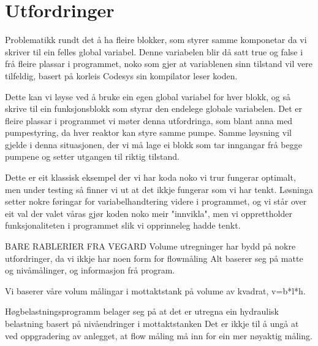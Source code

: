 \section{Utfordringer}
\thispagestyle{fancy}

Problematikk rundt det å ha fleire blokker, som styrer samme komponetar da vi skriver til ein felles global variabel.
Denne variabelen blir då satt true og false i frå fleire plassar i programmet, noko som gjer at variablenen sinn tilstand vil vere tilfeldig, basert på korleis Codesys sin kompilator leser koden.

Dette kan vi løyse ved å bruke ein egen global variabel for hver blokk, og så skrive til ein funksjonsblokk som styrar den endelege globale variabelen.
Det er fleire plassar i programmet vi møter denna utfordringa, som blant anna med pumpestyring, da hver reaktor kan styre samme pumpe.
Samme løysning vil gjelde i denna situasjonen, der vi må lage ei blokk som tar inngangar frå begge pumpene og setter utgangen til riktig tilstand.

Dette er eit klassisk eksempel der vi har koda noko vi trur fungerar optimalt, men under testing så finner vi ut at det ikkje fungerar som vi har tenkt.
Løsninga setter nokre føringar for variabelhandtering videre i programmet, og vi står over eit val der valet våras gjør koden noko meir "innvikla", men vi opprettholder
funksjonaliteten i programmet slik vi opprinneleg hadde tenkt.

BARE RABLERIER FRA VEGARD
Volume utregninger har bydd på nokre utfordringer, da vi ikkje har noen form for flowmåling
Alt baserer seg på matte og nivåmålinger, og informasjon frå program.

Vi baserer våre volum målingar i mottaktstank på volume av kvadrat, v=b*l*h.

Høgbelastningsprogramm belager seg på at det er utregna ein hydraulisk belastning basert på nivåendringer i mottaktstanken
Det er ikkje til å ungå at ved oppgradering av anlegget, at flow måling må inn for ein mer nøyaktig måling.